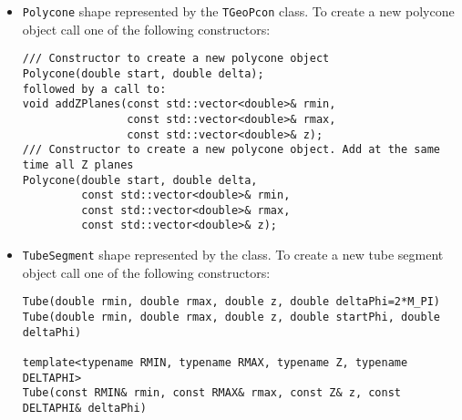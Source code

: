 \begin{itemize}
\begin{verbatim}
\end{verbatim}
\item \texttt{Polycone} shape represented by the \texttt{TGeoPcon} class. To create a new polycone object call one of the following constructors:
\begin{verbatim}
/// Constructor to create a new polycone object
Polycone(double start, double delta);
followed by a call to:
void addZPlanes(const std::vector<double>& rmin, 
                const std::vector<double>& rmax,
                const std::vector<double>& z);
/// Constructor to create a new polycone object. Add at the same time all Z planes
Polycone(double start, double delta, 
         const std::vector<double>& rmin, 
         const std::vector<double>& rmax, 
         const std::vector<double>& z);
\end{verbatim}
\item \texttt{TubeSegment} shape represented by the  class. To create a new tube segment object call one of the following constructors:
\begin{verbatim}
Tube(double rmin, double rmax, double z, double deltaPhi=2*M_PI)
Tube(double rmin, double rmax, double z, double startPhi, double deltaPhi)

template<typename RMIN, typename RMAX, typename Z, typename DELTAPHI>
Tube(const RMIN& rmin, const RMAX& rmax, const Z& z, const DELTAPHI& deltaPhi)  


\end{verbatim}
\end{itemize}
